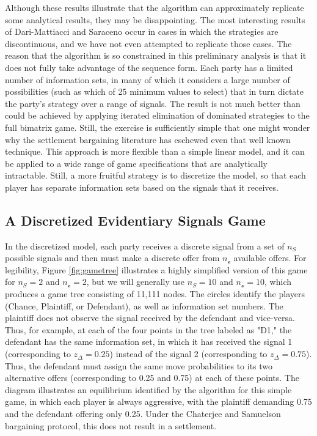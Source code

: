 \documentclass{article}
\begin{document}
Although these results illustrate that the algorithm can approximately replicate some analytical results, they may be disappointing. The most interesting results of Dari-Mattiacci and Saraceno occur in cases in which the strategies are discontinuous, and we have not even attempted to replicate those cases. The reason that the algorithm is so constrained in this preliminary analysis is that it does not fully take advantage of the sequence form. Each party has a limited number of information sets, in many of which it considers a large number of possibilities (such as which of 25 minimum values to select) that in turn dictate the party's strategy over a range of signals. The result is not much better than could be achieved by applying iterated elimination of dominated strategies to the full bimatrix game. Still, the exercise is sufficiently simple that one might wonder why the settlement bargaining literature has eschewed even that well known technique. This approach is more flexible than a simple linear model, and it can be applied to a wide range of game specifications that are analytically intractable. Still, a more fruitful strategy is to discretize the model, so that each player has separate information sets based on the signals that it receives.

\subsection{A Discretized Evidentiary Signals Game} \label{gametree}

In the discretized model, each party receives a discrete signal from a set of $n_S$ possible signals and then must make a discrete offer from $n_{\mathcal{o}}$ available offers. For legibility, Figure \ref{fig:gametree} illustrates a highly simplified version of this game for  $n_S=2$ and $n_{\mathcal{o}}=2$, but we will generally use  $n_S=10$ and $n_{\mathcal{o}}=10$, which produces a game tree consisting of 11,111 nodes. The circles identify the players (Chance, Plaintiff, or Defendant), as well as information set numbers. The plaintiff does not observe the signal received by the defendant and vice-versa. Thus, for example, at each of the four points in the tree labeled as "D1," the defendant has the same information set, in which it has received the signal 1 (corresponding to $z_\Delta = 0.25$) instead of the signal 2 (corresponding to $z_\Delta = 0.75$). Thus, the defendant must assign the same move probabilities to its two alternative offers (corresponding to 0.25 and 0.75) at each of these points. The diagram illustrates an equilibrium identified by the algorithm for this simple game, in which each player is always aggressive, with the plaintiff demanding 0.75 and the defendant offering only 0.25. Under the Chaterjee and Samuelson bargaining protocol, this does not result in a settlement.
\end{document}
